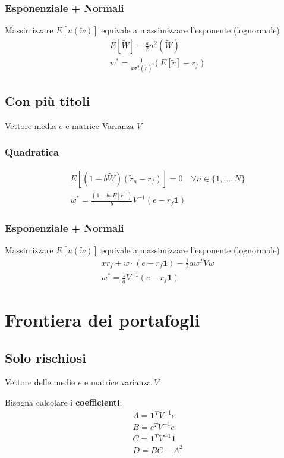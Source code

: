 \documentclass[a4paper,notitlepage]{report}%
\begin{document}
\begin{multicols*}{2}
    \subsubsection*{Esponenziale + Normali}
    Massimizzare $E[u(\tilde{w})]$ equivale a massimizzare l'esponente (lognormale)
    \begin{align*}
        & E[\tilde{W}]-\frac{a}{2}\sigma^2(\tilde{W})\\
        & w^* = \frac{1}{a\sigma^2(\tilde{r})}(E[\tilde{r}]-r_f)
    \end{align*}

    \subsection*{Con più titoli}
    Vettore media $e$ e matrice Varianza $V$

    \subsubsection*{Quadratica}
    \begin{align*}
        & E[(1-b\tilde{W}) (\tilde{r}_n-r_f)]=0 \quad \forall n \in \{ 1,\dots,N \} \\
        & w^* = \frac{(1-bxE[\tilde{r}])}{b} V^{-1}(e-r_f\mathbf{1})
    \end{align*}

    \subsubsection*{Esponenziale + Normali}
    Massimizzare $E[u(\tilde{w})]$ equivale a massimizzare l'esponente (lognormale)
    \begin{align*}
        & xr_f + w\cdot (e-r_f\mathbf{1})-\frac{1}{2} aw^TVw\\
        & w^* = \frac{1}{a} V^{-1}(e-r_f\mathbf{1})
    \end{align*}


\section*{Frontiera dei portafogli}

    \subsection*{Solo rischiosi}
        Vettore delle medie $e$ e matrice varianza $V$

        Bisogna calcolare i \textbf{coefficienti}:
        \begin{align*}
            & A = \mathbf{1}^T V^{-1} e \\
            & B = e^T V^{-1} e \\
            & C = \mathbf{1}^T V^{-1} \mathbf{1} \\
            & D = BC-A^2
        \end{align*}


\end{multicols*}
\end{document}
